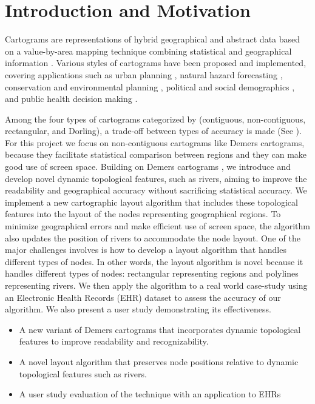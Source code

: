 \section{Introduction and Motivation}

Cartograms are representations of hybrid geographical and abstract data based on a value-by-area mapping technique combining statistical and geographical information \cite{dent2009Cartography}. Various styles of cartograms have been proposed and implemented, covering applications such as urban planning \cite{harris2018Mapping, arranz-lopez2021Enduser}, natural hazard forecasting \cite{pappenberger2019Cartograms, park2020Flood}, conservation and environmental planning \cite{galluzzi2018Mapping, rocchini2019Cartogramming}, political and social demographics \cite{breitzman2018Using, alieva2021How}, and public health decision making \cite{gao2020Visualising, sack2021Visualizing}.

Among the four types of cartograms categorized by  (contiguous, non-contiguous, rectangular, and Dorling), a trade-off between types of accuracy is made (See ). For this project we focus on non-contiguous cartograms like Demers cartograms, because they facilitate statistical comparison between regions and they can make good use of screen space. Building on Demers cartograms \cite{ian2002Cartogram}, we introduce and develop novel dynamic topological features, such as rivers, aiming to improve the readability and geographical accuracy without sacrificing statistical accuracy. We implement a new cartographic layout algorithm that includes these topological features into the layout of the nodes representing geographical regions. To minimize geographical errors and make efficient use of screen space, the algorithm also updates the position of rivers to accommodate the node layout. One of the major challenges involves is how to develop a layout algorithm that handles different types of nodes. In other words, the layout algorithm is novel because it handles different types of nodes: rectangular representing regions and polylines representing rivers. We then apply the algorithm to a real world case-study using an Electronic Health Records (EHR) dataset to assess the accuracy of our algorithm. We also present a user study demonstrating its effectiveness.


\begin{itemize}
    \item A new variant of Demers cartograms that incorporates dynamic topological features to improve readability and recognizability.
    \item A novel layout algorithm that preserves node positions relative to dynamic topological features such as rivers.
    \item A user study evaluation of the technique with an application to EHRs
\end{itemize}